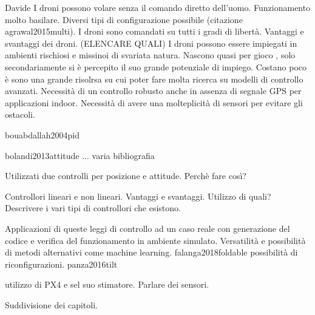\begin{commento}
	Davide 
	I droni possono volare senza il comando diretto dell'uomo. 
	Funzionamento molto basilare.
	Diversi tipi di configurazione possibile (citazione agrawal2015multi).
	I droni sono comandati su tutti i gradi di libertà.
	Vantaggi e svantaggi dei droni. (ELENCARE QUALI)
	I droni possono essere impiegati in ambienti rischiosi e missinoi di svariata natura.
	Nascono quasi per gioco , solo secondariamente si è percepito il suo grande potenziale di impiego.
	Costano poco è sono una grande risolrsa su cui poter fare molta ricerca su modelli di controllo avanzati.
	Necessità di un controllo robusto anche in assenza di segnale GPS per applicazioni indoor.
	Necessità di avere una molteplicità di sensori per evitare gli ostacoli.
	
	bouabdallah2004pid
	
	bolandi2013attitude ... varia bibliografia
	
	Utilizzati due controlli per posizione e attitude. Perchè fare così?
	
	Controllori lineari e non lineari. Vantaggi e svantaggi. Utilizzo di quali? Descrivere i vari tipi di controllori che esistono.
	
	Applicazioni di queste leggi di controllo ad un caso reale con generazione del codice e verifica del funzionamento in ambiente simulato.
	Versatilità e possibilità di metodi alternativi come machine learning.
	falanga2018foldable possibilità di riconfigurazioni. panza2016tilt
	
	utilizzo di PX4 e sel suo stimatore.
	Parlare dei sensori.
	
	Suddivisione dei capitoli.
\end{commento}



